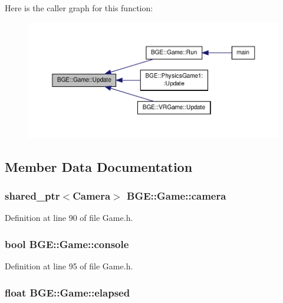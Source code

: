 Here is the caller graph for this function\-:
\nopagebreak
\begin{figure}[H]
\begin{center}
\leavevmode
\includegraphics[width=350pt]{class_b_g_e_1_1_game_a51ed573392d7bed791b67062e7c7a3d4_icgraph}
\end{center}
\end{figure}




\subsection{Member Data Documentation}
\hypertarget{class_b_g_e_1_1_game_a529f329238da26b1bc8199f46edb6754}{
\subsubsection[{camera}]{\setlength{\rightskip}{0pt plus 5cm}shared\-\_\-ptr$<${\bf Camera}$>$ B\-G\-E\-::\-Game\-::camera}}\label{class_b_g_e_1_1_game_a529f329238da26b1bc8199f46edb6754}


Definition at line 90 of file Game.\-h.

\hypertarget{class_b_g_e_1_1_game_ae6c23ffff29b83b65a253788e4e8a735}{
\subsubsection[{console}]{\setlength{\rightskip}{0pt plus 5cm}bool B\-G\-E\-::\-Game\-::console}}\label{class_b_g_e_1_1_game_ae6c23ffff29b83b65a253788e4e8a735}


Definition at line 95 of file Game.\-h.

\hypertarget{class_b_g_e_1_1_game_aedae810ac31a45184e38a24b643d1825}{
\subsubsection[{elapsed}]{\setlength{\rightskip}{0pt plus 5cm}float B\-G\-E\-::\-Game\-::elapsed}}\label{class_b_g_e_1_1_game_aedae810ac31a45184e38a24b643d1825}


